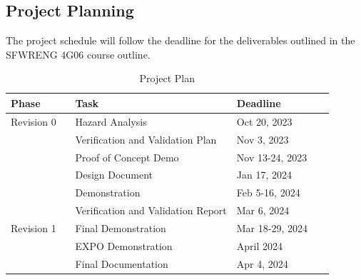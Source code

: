 \documentclass[12pt]{article}
\begin{document}
\subsection{Project Planning}

The project schedule will follow the deadline for the deliverables outlined in the SFWRENG
4G06 course outline.

\begin{table}[H]
    \centering
    \begin{tabular}{|p{0.2\linewidth} | p{0.5\linewidth}| p{0.3\linewidth} |}
    \hline
    \textbf{Phase} & \textbf{Task} & \textbf{Deadline}\\
    \hline
    Revision 0 & Hazard Analysis & Oct 20, 2023 \\
     \cline{2-3} & Verification and Validation Plan & Nov 3, 2023 \\
     \cline{2-3} & Proof of Concept Demo & Nov 13-24, 2023\\
     \cline{2-3} & Design Document & Jan 17, 2024\\
     \cline{2-3} & Demonstration & Feb 5-16, 2024\\
     \cline{2-3} & Verification and Validation Report & Mar 6, 2024\\
     \hline
     Revision 1 & Final Demonstration & Mar 18-29, 2024\\
     \cline{2-3} & EXPO Demonstration & April 2024\\
     \cline{2-3} & Final Documentation & Apr 4, 2024\\
    \hline
    \end{tabular}
    \caption{Project Plan}
    \label{TblProjectTasks}
\end{table}
\end{document}
